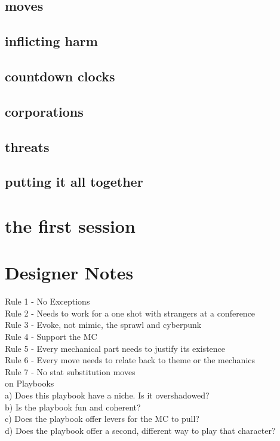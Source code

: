 \documentclass{tufte-book}
\begin{document}
\section{moves}			\label{sec: mcmoves}
\section{inflicting harm}		\label{sec:inflicting harm}
\section{countdown clocks}	\label{sec:countdown clocks}
\section{corporations} 		\label{sec: corporations}
\section{threats}			\label{sec: threats}
\section{putting it all together} 	\label{sec: putting it all together}

\chapter{the first session} \label{ch: the first session}

\chapter{Designer Notes}

Rule 1 - No Exceptions\\
Rule 2 - Needs to work for a one shot with strangers at a conference\\
Rule 3 - Evoke, not mimic, the sprawl and cyberpunk\\
Rule 4 - Support the MC\\
Rule 5 - Every mechanical part needs to justify its existence\\
Rule 6 - Every move needs to relate back to theme or the mechanics\\
Rule 7 - No stat substitution moves\\

on Playbooks\\
a) Does this playbook have a niche. Is it overshadowed?\\
b) Is the playbook fun and coherent?\\
c) Does the playbook offer levers for the MC to pull?\\
d) Does the playbook offer a second, different way to play that character?\\
\end{document}
